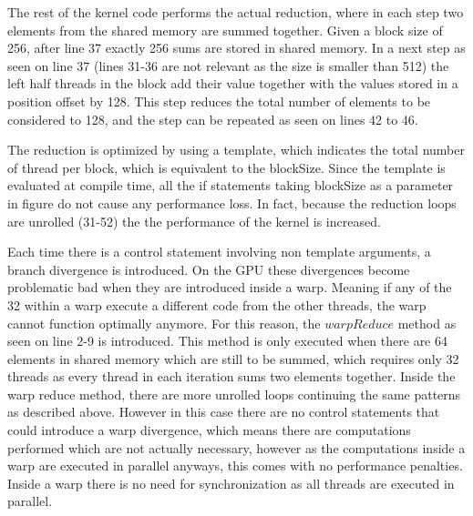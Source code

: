 \documentclass[]{article}
\begin{document}
The rest of the kernel code performs the actual reduction, where in each step two elements from the shared memory are summed together. Given a block size of 256, after line 37 exactly 256 sums are stored in shared memory. In a next step as seen on line 37 (lines 31-36 are not relevant as the size is smaller than 512) the left half threads in the block add their value together with the values stored in a position offset by 128. This step reduces the total number of elements to be considered to 128, and the step can be repeated as seen on lines 42 to 46. 

The reduction is optimized by using a template, which indicates the total number of thread per block, which is equivalent to the blockSize. Since the template is evaluated at compile time, all the if statements taking blockSize as a parameter in figure do not cause any performance loss. In fact, because  the reduction loops are unrolled (31-52) the the performance of the kernel is increased. 

Each time there is a control statement involving non template arguments, a branch divergence is introduced. On the GPU these divergences become problematic bad when they are introduced inside a warp. Meaning if any of the 32 within a warp execute a different code from the other threads, the warp cannot function optimally anymore. For this reason, the $warpReduce$ method as seen on line 2-9 is introduced. This method is only executed when there are 64 elements in shared memory which are still to be summed, which requires only 32 threads as every thread in each iteration sums two elements together. Inside the warp reduce method, there are more unrolled loops continuing the same patterns as described above. However in this case there are no control statements that could introduce a warp divergence, which means there are computations performed which are not actually necessary, however as the computations inside a warp are executed in parallel anyways, this comes with no performance penalties. Inside a warp there is no need for synchronization as all threads are executed in parallel. 
\end{document}
